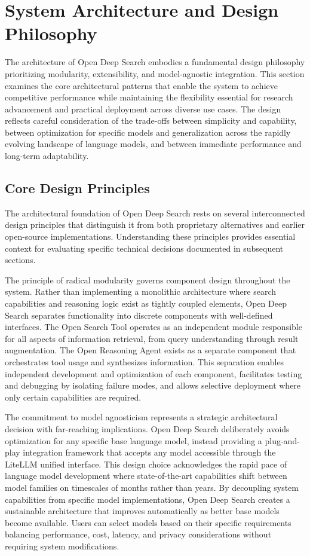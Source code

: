 \section{System Architecture and Design Philosophy}

The architecture of Open Deep Search embodies a fundamental design philosophy prioritizing modularity, extensibility, and model-agnostic integration. This section examines the core architectural patterns that enable the system to achieve competitive performance while maintaining the flexibility essential for research advancement and practical deployment across diverse use cases. The design reflects careful consideration of the trade-offs between simplicity and capability, between optimization for specific models and generalization across the rapidly evolving landscape of language models, and between immediate performance and long-term adaptability.

\subsection{Core Design Principles}

The architectural foundation of Open Deep Search rests on several interconnected design principles that distinguish it from both proprietary alternatives and earlier open-source implementations. Understanding these principles provides essential context for evaluating specific technical decisions documented in subsequent sections.

The principle of radical modularity governs component design throughout the system. Rather than implementing a monolithic architecture where search capabilities and reasoning logic exist as tightly coupled elements, Open Deep Search separates functionality into discrete components with well-defined interfaces. The Open Search Tool operates as an independent module responsible for all aspects of information retrieval, from query understanding through result augmentation. The Open Reasoning Agent exists as a separate component that orchestrates tool usage and synthesizes information. This separation enables independent development and optimization of each component, facilitates testing and debugging by isolating failure modes, and allows selective deployment where only certain capabilities are required.

The commitment to model agnosticism represents a strategic architectural decision with far-reaching implications. Open Deep Search deliberately avoids optimization for any specific base language model, instead providing a plug-and-play integration framework that accepts any model accessible through the LiteLLM unified interface. This design choice acknowledges the rapid pace of language model development where state-of-the-art capabilities shift between model families on timescales of months rather than years. By decoupling system capabilities from specific model implementations, Open Deep Search creates a sustainable architecture that improves automatically as better base models become available. Users can select models based on their specific requirements balancing performance, cost, latency, and privacy considerations without requiring system modifications.

